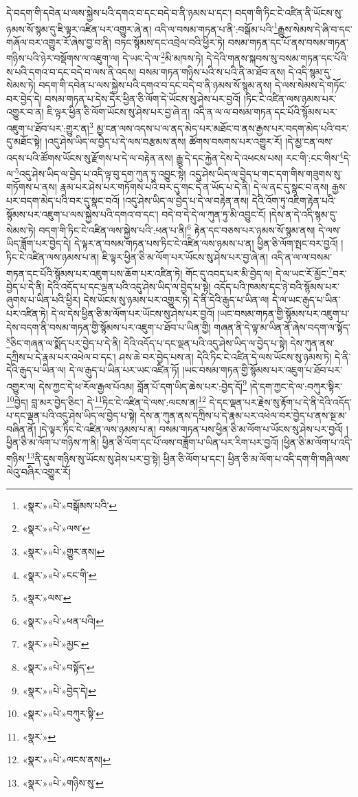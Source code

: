 དེ་བདག་གི་དབེན་པ་ལས་སྐྱེས་པའི་དགའ་བ་དང་བདེ་བ་ནི་ཉམས་པ་དང་། བདག་གི་ཏིང་ངེ་འཛིན་ནི་ཡོངས་སུ་ཉམས་སོ་སྙམ་དུ་ཇི་ལྟར་འཛིན་པར་འགྱུར་ཞེ་ན། འདི་ལ་བསམ་གཏན་པ་ནི་:བསྒོམ་པའི་\footnote{«སྣར་»«པེ་»བསྒོམས་པའི་}རྒྱུས་སེམས་དེ་ཞི་བ་དང་གཞོལ་བར་འགྱུར་རོ་ཞེས་བྱ་བ་ནི། བཏང་སྙོམས་དང་འབྲེལ་བའི་ཕྱིར་ཏེ། བསམ་གཏན་དང་པོ་ནས་བསམ་གཏན་གཉིས་པའི་ཉེར་བསྡོགས་ལ་འཇུག་ལ། དེ་ཡང་དེ་ལ་\footnote{«སྣར་»«པེ་»ལས་}མི་མཁས་ཏེ། དེ་དེའི་གནས་སྐབས་སུ་བསམ་གཏན་དང་པོའི་ས་པའི་དགའ་བ་དང་བདེ་བ་ལས་ནི་འདས། བསམ་གཏན་གཉིས་པའི་ས་པའི་ནི་མ་ཐོབ་ནས། དེ་འདི་སྙམ་དུ་སེམས་ཏེ། བདག་གི་དབེན་པ་ལས་སྐྱེས་པའི་དགའ་བ་དང་བདེ་བ་ནི་ཉམས་སོ་སྙམ་ནས། དེ་ལས་སེམས་དེ་གཏོང་བར་བྱེད་དེ། བསམ་གཏན་པ་དེས་དེར་ཕྱིན་ཅི་ལོག་དེ་ཡོངས་སུ་ཤེས་པར་བྱའོ། །ཏིང་ངེ་འཛིན་ལས་ཉམས་པར་འགྱུར་བ་ན། ཇི་ལྟར་ཕྱིན་ཅི་ལོག་ཡོངས་སུ་ཤེས་པར་བྱ་ཞེ་ན། འདི་ན་ལ་ལ་བསམ་གཏན་དང་པོའི་སྙོམས་པར་འཇུག་པ་ཐོབ་པར་:གྱུར་ན།\footnote{«སྣར་»«པེ་»གྱུར་ནས།} མྱ་ངན་ལས་འདས་པ་ལ་ནད་མེད་པར་མཐོང་བ་ནས་རྒྱས་པར་བདག་མེད་པའི་བར་དུ་མཐོང་སྟེ། །འདུ་ཤེས་ཡིད་ལ་བྱེད་པ་དེ་ལས་བརྩམས་ནས། ཚོགས་བསགས་པར་འགྱུར་རོ། །དེ་མྱ་ངན་ལས་འདས་པའི་ཚོགས་ཡོངས་སུ་རྫོགས་པ་དེ་ལ་བརྟེན་ནས། རྒྱུ་དེ་དང་རྐྱེན་དེས་དེ་འཕངས་པས། རང་གི་:ངང་གིས་\footnote{«སྣར་»«པེ་»ངང་གི་}དེ་ལ་\footnote{«སྣར་»ལས་}འདུ་ཤེས་ཡིད་ལ་བྱེད་པ་འདི་ལྟ་བུ་དག་ཀུན་ཏུ་འབྱུང་སྟེ། འདུ་ཤེས་ཡིད་ལ་བྱེད་པ་གང་དག་གིས་གཟུགས་སུ་གཏོགས་པ་ནས། རྣམ་པར་ཤེས་པར་གཏོགས་པའི་བར་དུ་གང་དེ་ན་ཡོད་པ་དེ་ནི། དེ་ལ་ནང་དུ་སྣང་བ་ནས། རྒྱས་པར་བདག་མེད་པའི་བར་དུ་སྣང་བའོ། །འདུ་ཤེས་ཡིད་ལ་བྱེད་པ་དེ་ལ་བརྟེན་ནས། དེའི་འོག་ཏུ་འཇིག་རྟེན་པའི་སྙོམས་པར་འཇུག་པ་ལས་སྐྱེས་པའི་དགའ་བ་དང་། བདེ་བ་དེ་དེ་ལ་ཀུན་ཏུ་མི་འབྱུང་ངོ། །དེས་ན་དེ་འདི་སྙམ་དུ་སེམས་ཏེ། བདག་གི་ཏིང་ངེ་འཛིན་ལས་སྐྱེས་པའི་:ཕན་པ་ནི།\footnote{«སྣར་»«པེ་»ཕན་པའི།} རྟེན་དང་བཅས་པར་ཉམས་སོ་སྙམ་ནས། དེ་ལས་ཡིད་ཟློག་པར་བྱེད་དེ། དེ་ལྟར་ན་བསམ་གཏན་པས་ཏིང་ངེ་འཛིན་ལས་ཉམས་པ་ན། ཕྱིན་ཅི་ལོག་སྤང་བར་བྱའོ། །ཏིང་ངེ་འཛིན་ལས་ཉམས་པ་ན། ཇི་ལྟར་ཕྱིན་ཅི་མ་ལོག་པར་ཡོངས་སུ་ཤེས་པར་བྱ་ཞེ་ན། འདི་ན་ལ་ལ་བསམ་གཏན་དང་པོའི་སྙོམས་པར་འཇུག་པས་ཆོག་པར་འཛིན་ཏེ། གོང་དུ་འབད་པར་མི་བྱེད་ལ། དེ་ལ་ཡང་རོ་མྱོང་\footnote{«སྣར་»«པེ་»མྱང་}བར་བྱེད་པ་དེ་ནི། དེའི་འདོད་པ་དང་ལྡན་པའི་འདུ་ཤེས་ཡིད་ལ་བྱེད་པ་སྟེ། འདོད་པའི་ཁམས་དང་ཉེ་བའི་སྙོམས་པར་ཞུགས་པ་ཡིན་པའི་ཕྱིར། དེས་ཡོངས་སུ་ཉམས་པར་འགྱུར་ཏེ། དེ་ནི་དེའི་རྒུད་པ་ཡིན་ལ། དེ་ལ་ཡང་རྒུད་པ་ཡིན་པར་འཛིན་ཏེ། དེ་ལ་དེས་ཕྱིན་ཅི་མ་ལོག་པར་ཡོངས་སུ་ཤེས་པར་བྱའོ། །ཡང་བསམ་གཏན་གྱི་སྙོམས་པར་འཇུག་པ་དེས་བདག་ནི་བསམ་གཏན་གྱི་སྙོམས་པར་འཇུག་པ་ཐོབ་པ་ཡིན་གྱི། གཞན་ནི་དེ་ལྟ་མ་ཡིན་ནོ་ཞེས་བདག་ལ་སྟོད་\footnote{«སྣར་»«པེ་»བསྟོད་}ཅིང་གཞན་ལ་སྨོད་པར་བྱེད་པ་དེ་ནི། དེའི་འདོད་པ་དང་ལྡན་པའི་འདུ་ཤེས་ཡིད་ལ་བྱེད་པ་སྟེ། དེས་ཀུན་ནས་དཀྲིས་པ་དེ་རྣམ་པར་འཕེལ་བ་དང་། ཤས་ཆེ་བར་བྱེད་པས་ན། དེའི་ཏིང་ངེ་འཛིན་དེ་ལས་ཡོངས་སུ་ཉམས་ཏེ། དེ་ནི་དེའི་རྒུད་པ་ཡིན་ལ། དེ་ལ་རྒུད་པ་ཡིན་པར་ཡང་འཛིན་ཏོ། །ཡང་བསམ་གཏན་གྱི་སྙོམས་པར་འཇུག་པ་ཐོབ་པར་འགྱུར་ལ། དེས་ཀྱང་དེ་ཕ་རོལ་རྒྱལ་པོའམ། བློན་པོ་དག་ཡིད་ཆེས་པར་:བྱེད་དོ།\footnote{«སྣར་»«པེ་»བྱེད་དེ།} །དེ་དག་ཀྱང་དེ་ལ་:བཀུར་སྟིར་\footnote{«སྣར་»«པེ་»བཀུར་སྟི་}བྱེད། བླ་མར་བྱེད་ཅིང་། དེ་\footnote{«སྣར་»}ཏིང་ངེ་འཛིན་དེ་ལས་:ལངས་ན།\footnote{«སྣར་»«པེ་»ལངས་ནས།} དེ་དང་ལྡན་པར་རྗེས་སུ་རྟོག་པ་དེ་ནི་དེའི་འདོད་པ་དང་ལྡན་པའི་འདུ་ཤེས་ཡིད་ལ་བྱེད་པ་སྟེ། དེས་ན་ཀུན་ནས་དཀྲིས་པ་དེ་རྣམ་པར་འཕེལ་བར་བྱེད་པ་ནས་སྔ་མ་བཞིན་ནོ། །དེ་ལྟར་ཏིང་ངེ་འཛིན་ལས་ཉམས་པ་ན། བསམ་གཏན་པས་ཕྱིན་ཅི་མ་ལོག་པ་ཡོངས་སུ་ཤེས་པར་བྱའོ། །ཕྱིན་ཅི་མ་ལོག་པ་གཉིས་ཀ་ནི། ཕྱིན་ཅི་ལོག་དང་པོ་ལས་བཟློག་པ་ཡིན་པར་རིག་པར་བྱའོ། །ཕྱིན་ཅི་མ་ལོག་པ་འདི་གཉིས་\footnote{«སྣར་»«པེ་»གཉིས་སུ་}ནི་དུས་གཉིས་སུ་ཡོངས་སུ་ཤེས་པར་བྱ་སྟེ། ཕྱིན་ཅི་ལོག་པ་དང་། ཕྱིན་ཅི་མ་ལོག་པ་འདི་དག་གི་གཞི་ལས་ལེའུ་བཞིར་འགྱུར་རོ། 